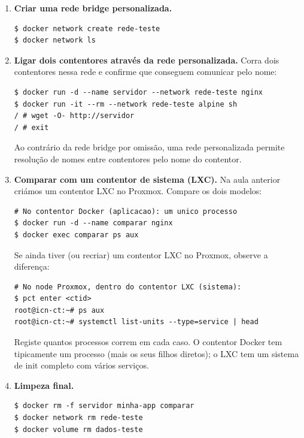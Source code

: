 \documentclass[11pt,a4paper]{article}
\begin{document}
\begin{enumerate}[label=\arabic*.]
  \item \textbf{Criar uma rede bridge personalizada.}
\begin{lstlisting}
$ docker network create rede-teste
$ docker network ls
\end{lstlisting}

  \item \textbf{Ligar dois contentores através da rede personalizada.} Corra dois contentores nessa rede e confirme que conseguem comunicar pelo nome:
\begin{lstlisting}
$ docker run -d --name servidor --network rede-teste nginx
$ docker run -it --rm --network rede-teste alpine sh
/ # wget -O- http://servidor
/ # exit
\end{lstlisting}
  Ao contrário da rede bridge por omissão, uma rede personalizada permite resolução de nomes entre contentores pelo nome do contentor.

  \item \textbf{Comparar com um contentor de sistema (LXC).} Na aula anterior criámos um contentor LXC no Proxmox. Compare os dois modelos:
\begin{lstlisting}
# No contentor Docker (aplicacao): um unico processo
$ docker run -d --name comparar nginx
$ docker exec comparar ps aux
\end{lstlisting}
  Se ainda tiver (ou recriar) um contentor LXC no Proxmox, observe a diferença:
\begin{lstlisting}
# No node Proxmox, dentro do contentor LXC (sistema):
$ pct enter <ctid>
root@icn-ct:~# ps aux
root@icn-ct:~# systemctl list-units --type=service | head
\end{lstlisting}
  Registe quantos processos correm em cada caso. O contentor Docker tem tipicamente um processo (mais os seus filhos diretos); o LXC tem um sistema de init completo com vários serviços.

  \item \textbf{Limpeza final.}
\begin{lstlisting}
$ docker rm -f servidor minha-app comparar
$ docker network rm rede-teste
$ docker volume rm dados-teste
\end{lstlisting}

\end{enumerate}
\end{document}
